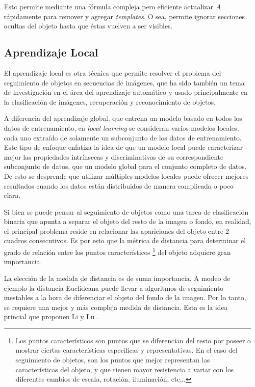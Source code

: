 \documentclass[a4paper,10pt]{article}
\begin{document}
Esto permite mediante una fórmula compleja pero eficiente actualizar $A$
rápidamente para remover y agregar \textit{templates}. O sea, permite ignorar
secciones ocultas del objeto hasta que éstas vuelven a ser visibles.

\subsection{Aprendizaje Local}

El aprendizaje local es otra técnica que permite resolver el problema del seguimiento de objetos en secuencias de imágenes,
que ha sido también un tema de investigación en el área del aprendizaje automático \cite{local-learning-machine-learning} y usado principalmente en la clasificación
de imágenes, recuperación y reconocimiento de objetos.

A diferencia del aprendizaje global, que entrena un modelo basado en
todos los datos de entrenamiento, en \textit{local learning} se consideran
varios modelos locales, cada uno extraído de solamente un subconjunto de los
datos de entrenamiento. Este tipo de enfoque enfatiza la idea de que un modelo
local puede caracterizar mejor las propiedades intrínsecas y discriminativas de
su correspondiente subconjunto de datos, que un modelo global para el conjunto
completo de datos. De esto se desprende que utilizar múltiples modelos locales
puede ofrecer mejores resultados cuando los datos están distribuidos de manera
complicada o poco clara.

Si bien se puede pensar al seguimiento de objetos como una tarea de clasificación binaria
que apunta a separar el objeto del resto de la imagen o fondo, en realidad, el principal
problema reside en relacionar las apariciones del objeto entre 2 cuadros
consecutivos. Es por esto que la métrica de distancia para determinar el grado
de relación entre los puntos característicos \footnote{Los puntos
  característicos son puntos que se diferencian del resto por poseer o mostrar
ciertas características específicas y representativas. En el caso del
seguimiento de objetos, son los puntos que mejor representan las
características del objeto, y que tienen mayor resistencia a variar con los
diferentes cambios de escala, rotación, iluminación, etc...} del objeto
adquiere gran importancia.

La elección de la medida de distancia es de suma importancia. A modeo de
ejemplo la distancia Euclideana puede llevar a algoritmos de seguimiento
inestables a la hora de diferenciar el objeto del fondo de la imagen. Por lo
tanto, se requiere una mejor y más compleja medida de distancia. Esta es la
idea princial que proponen Li y Lu \cite{local-learning}.
\end{document}
